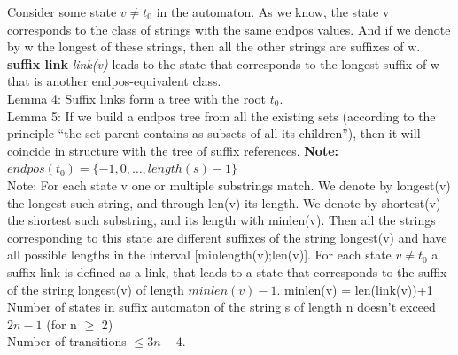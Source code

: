\documentclass[8pt, a4paper, oneside, twocolumn]{extarticle}
\begin{document}
Consider some state $v \neq t_0$ in the automaton. As we know, the state v corresponds to the class of strings with the same endpos values. And if we denote by w the longest of these strings, then all the other strings are suffixes of w. \textbf{suffix link} \textit{link(v)} leads to the state that corresponds to the longest suffix of w that is another endpos-equivalent class.\\
Lemma 4: Suffix links form a tree with the root $t_0$.\\
Lemma 5: If we build a endpos tree from all the existing sets (according to the principle “the set-parent contains as subsets of all its children”), then it will coincide in structure with the tree of suffix references. \textbf{Note: }$endpos(t_0) = \{-1, 0, \dots, length(s)-1\}$\\
Note: For each state v one or multiple substrings match. We denote by longest(v) the longest such string, and through len(v) its length. We denote by shortest(v) the shortest such substring, and its length with minlen(v). Then all the strings corresponding to this state are different suffixes of the string longest(v) and have all possible lengths in the interval [minlength(v);len(v)]. For each state $v \neq t_0$ a suffix link is defined as a link, that leads to a state that corresponds to the suffix of the string longest(v) of length $minlen(v) − 1$. minlen(v) = len(link(v))+1 \\
Number of states in suffix automaton of the string s of length n doesn't exceed $2n - 1$ (for n $\geq$ 2)\\
Number of transitions $\leq 3n - 4$.
\end{document}
